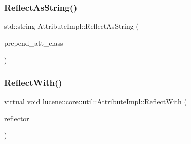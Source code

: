 \subsubsection{\texorpdfstring{Reflect\+As\+String()}{ReflectAsString()}}
{\footnotesize\ttfamily std\+::string Attribute\+Impl\+::\+Reflect\+As\+String (\begin{DoxyParamCaption}\item[{\mbox{\hyperlink{ZlibCrc32_8h_a2c212835823e3c54a8ab6d95c652660e}{const}} bool}]{prepend\+\_\+att\+\_\+class }\end{DoxyParamCaption})}

\mbox{\label{classlucene_1_1core_1_1util_1_1AttributeImpl_a84d34275fb1ed67ac36fad7ff6388096}} 
\subsubsection{\texorpdfstring{Reflect\+With()}{ReflectWith()}}
{\footnotesize\ttfamily virtual void lucene\+::core\+::util\+::\+Attribute\+Impl\+::\+Reflect\+With (\begin{DoxyParamCaption}\item[{\mbox{\hyperlink{namespacelucene_1_1core_1_1util_a7dbb701adaed055f73fb95eec83da10a}{Attribute\+Reflector}} \&}]{reflector }\end{DoxyParamCaption})\hspace{0.3cm}{\ttfamily [pure virtual]}}



